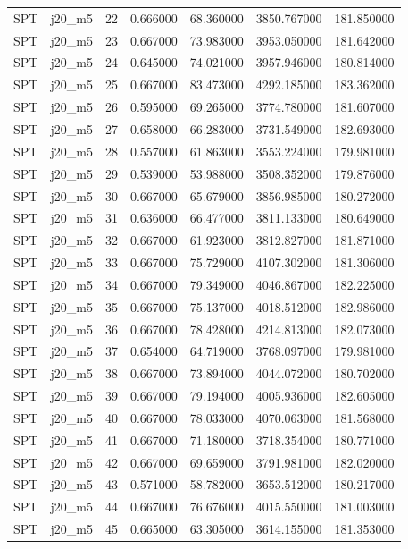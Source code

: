 \begin{tabular}{llrrrrr}
SPT & j20_m5 & 22 & 0.666000 & 68.360000 & 3850.767000 & 181.850000 \\
SPT & j20_m5 & 23 & 0.667000 & 73.983000 & 3953.050000 & 181.642000 \\
SPT & j20_m5 & 24 & 0.645000 & 74.021000 & 3957.946000 & 180.814000 \\
SPT & j20_m5 & 25 & 0.667000 & 83.473000 & 4292.185000 & 183.362000 \\
SPT & j20_m5 & 26 & 0.595000 & 69.265000 & 3774.780000 & 181.607000 \\
SPT & j20_m5 & 27 & 0.658000 & 66.283000 & 3731.549000 & 182.693000 \\
SPT & j20_m5 & 28 & 0.557000 & 61.863000 & 3553.224000 & 179.981000 \\
SPT & j20_m5 & 29 & 0.539000 & 53.988000 & 3508.352000 & 179.876000 \\
SPT & j20_m5 & 30 & 0.667000 & 65.679000 & 3856.985000 & 180.272000 \\
SPT & j20_m5 & 31 & 0.636000 & 66.477000 & 3811.133000 & 180.649000 \\
SPT & j20_m5 & 32 & 0.667000 & 61.923000 & 3812.827000 & 181.871000 \\
SPT & j20_m5 & 33 & 0.667000 & 75.729000 & 4107.302000 & 181.306000 \\
SPT & j20_m5 & 34 & 0.667000 & 79.349000 & 4046.867000 & 182.225000 \\
SPT & j20_m5 & 35 & 0.667000 & 75.137000 & 4018.512000 & 182.986000 \\
SPT & j20_m5 & 36 & 0.667000 & 78.428000 & 4214.813000 & 182.073000 \\
SPT & j20_m5 & 37 & 0.654000 & 64.719000 & 3768.097000 & 179.981000 \\
SPT & j20_m5 & 38 & 0.667000 & 73.894000 & 4044.072000 & 180.702000 \\
SPT & j20_m5 & 39 & 0.667000 & 79.194000 & 4005.936000 & 182.605000 \\
SPT & j20_m5 & 40 & 0.667000 & 78.033000 & 4070.063000 & 181.568000 \\
SPT & j20_m5 & 41 & 0.667000 & 71.180000 & 3718.354000 & 180.771000 \\
SPT & j20_m5 & 42 & 0.667000 & 69.659000 & 3791.981000 & 182.020000 \\
SPT & j20_m5 & 43 & 0.571000 & 58.782000 & 3653.512000 & 180.217000 \\
SPT & j20_m5 & 44 & 0.667000 & 76.676000 & 4015.550000 & 181.003000 \\
SPT & j20_m5 & 45 & 0.665000 & 63.305000 & 3614.155000 & 181.353000 \\

\end{tabular}

